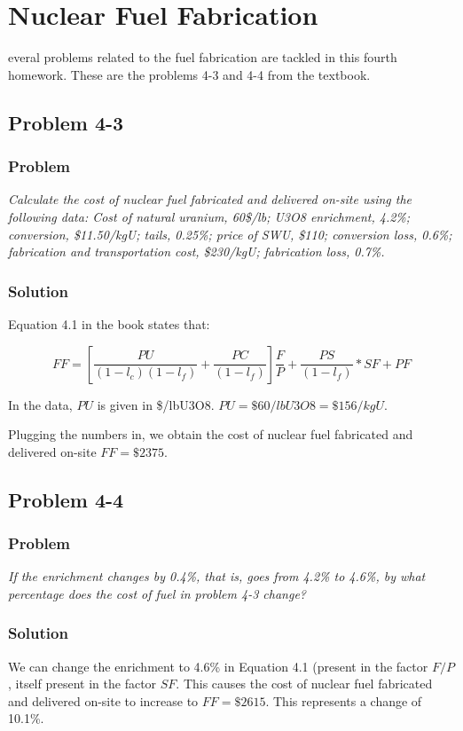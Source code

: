 %
%
\let\textcircled=\pgftextcircled
\chapter{Nuclear Fuel Fabrication}
\label{chap:intro}

everal problems related to the fuel fabrication are tackled in this fourth homework. These are the problems 4-3 and 4-4 from the textbook.

\section{Problem 4-3}
\label{prob43}


\subsection{Problem}
\textit{Calculate the cost of nuclear fuel fabricated and delivered on-site using the following data: Cost of natural uranium, 60\$/lb; U3O8 enrichment, 4.2\%; conversion, \$11.50/kgU; tails, 0.25\%; price of SWU, \$110; conversion loss, 0.6\%; fabrication and transportation cost, \$230/kgU; fabrication loss, 0.7\%.}

\subsection{Solution}

Equation 4.1 in the book states that:

\begin{equation}
FF = \left[ \frac{PU}{(1-l_c)(1-l_f)} + \frac{PC}{(1-l_f)} \right] \frac{F}{P} + \frac{PS}{(1-l_f)}*SF + PF
\end{equation}

In the data, $PU$ is given in \$/lbU3O8. $PU = \$60/lbU3O8 = \$156/kgU$.

Plugging the numbers in, we obtain the cost of nuclear fuel fabricated and delivered on-site $FF = \$2375$.

\section{Problem 4-4}
\label{prob44}


\subsection{Problem}
\textit{If the enrichment changes by 0.4\%, that is, goes from 4.2\% to 4.6\%, by what percentage does the cost of fuel in problem 4-3 change?}

\subsection{Solution}

We can change the enrichment to 4.6\% in Equation 4.1 (present in the factor $F/P$, itself present in the factor $SF$. This causes the cost of nuclear fuel fabricated and delivered on-site to increase to $FF = \$2615$. This represents a change of 10.1\%.
